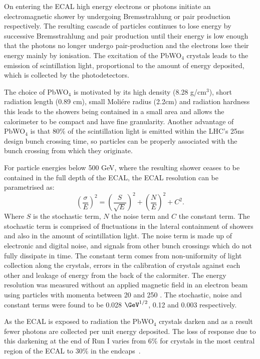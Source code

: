  On entering the \ac{ECAL} high energy electrons or photons initiate an electromagnetic shower by undergoing Bremsstrahlung or pair production respectively. The resulting cascade of particles continues to lose energy by successive Bremsstrahlung and pair production until their energy is low enough that the photons no longer undergo pair-production and the electrons lose their energy mainly by ionisation. The excitation of the PbWO$_{4}$ crystals leads to the emission of scintillation light, proportional to the amount of energy deposited, which is collected by the photodetectors.

The choice of PbWO$_{4}$ is motivated by its high density (8.28 g/cm$^{3}$), short radiation length (0.89 cm), small Moli\'{e}re radius (2.2cm) and radiation hardness this leads to the showers being contained in a small area and allows the calorimeter to be compact and have fine granularity. Another advantage of PbWO$_{4}$ is that 80\% of the scintillation light is emitted within the LHC's 25ns design bunch crossing time, so particles can be properly associated with the bunch crossing from which they originate.

For particle energies below 500 GeV, where the resulting shower ceases to be contained in the full depth of the \ac{ECAL}, the \ac{ECAL} resolution can be parametrised as:
\begin{equation}
  \label{eq:ecalres}
  \left(\frac{\sigma}{E}\right)^2=\left(\frac{S}{\sqrt{E}}\right)^2+\left(\frac{N}{E}\right)^2+C^2.
\end{equation}
Where $S$ is the stochastic term, $N$ the noise term and $C$ the constant term. The stochastic term is comprised of fluctuations in the lateral containment of showers and also in the amount of scintillation light. The noise term is made up of electronic and digital noise, and signals from other bunch crossings which do not fully dissipate in time. The constant term comes from non-uniformity of light collection along the crystals, errors in the calibration of crystals against each other and leakage of energy from the back of the calormiter. The energy resolution was measured without an applied magnetic field in an electron beam using particles with momenta between 20 and 250 \GeV. The stochastic, noise and constant terms were found to be 0.028 $\GeV^{1/2}$, 0.12 \GeV and 0.003 respectively.

As the \ac{ECAL} is exposed to radiation the PbWO$_{4}$ crystals darken and as a result fewer photons are collected per unit energy deposited. The loss of response due to this darkening at the end of Run I varies from 6\% for crystals in the most central region of the \ac{ECAL} to 30\% in the endcaps~\cite{CMS-DP-2015-063}.


